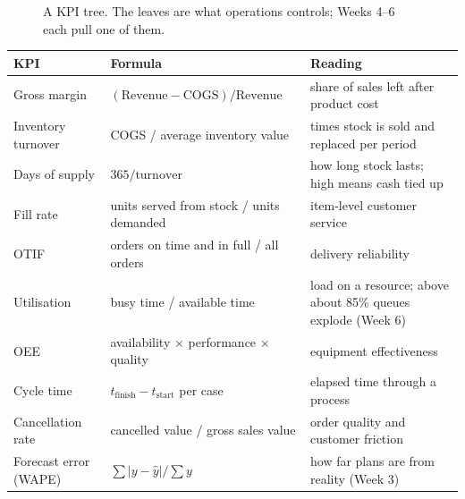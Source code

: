 \begin{figure}[H]
\centering
{}
\caption{A KPI tree. The leaves are what operations controls; Weeks 4--6 each pull one of them.}
\end{figure}

\begin{center}\small
\begin{tabularx}{\linewidth}{@{}L{3.2cm}L{4.4cm}Y@{}}
\toprule
\textbf{KPI} & \textbf{Formula} & \textbf{Reading}\\\midrule
Gross margin & $(\text{Revenue}-\text{COGS})/\text{Revenue}$ & share of sales left after product cost\\
Inventory turnover & COGS / average inventory value & times stock is sold and replaced per period\\
Days of supply & $365/\text{turnover}$ & how long stock lasts; high means cash tied up\\
Fill rate & units served from stock / units demanded & item-level customer service\\
OTIF & orders on time and in full / all orders & delivery reliability\\
Utilisation & busy time / available time & load on a resource; above about 85\% queues explode (Week 6)\\
OEE & availability $\times$ performance $\times$ quality & equipment effectiveness\\
Cycle time & $t_{\text{finish}}-t_{\text{start}}$ per case & elapsed time through a process\\
Cancellation rate & cancelled value / gross sales value & order quality and customer friction\\
Forecast error (WAPE) & $\sum|y-\hat y| / \sum y$ & how far plans are from reality (Week 3)\\\bottomrule
\end{tabularx}
\end{center}

